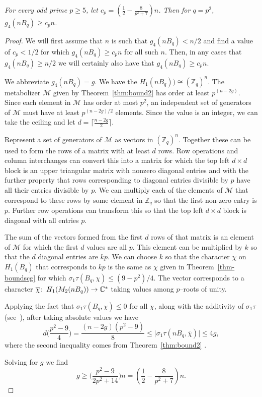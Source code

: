 \documentclass[10pt,oneside]{amsart}
\def\Z{{\mathbb Z}}
\def\C{{\mathbb C}}
\def\calm{\mathcal{M}}
\def\co{\colon\thinspace}
\theoremstyle{definition}
\begin{document}
 {\it  For every odd prime $p \ge 5$,  let  $c_p =  (\frac{1}{2}  - \frac{8}{p^2+7})n$. Then  for $q = p^2$,  $g_4(nB_q) \ge c_pn$.}
\begin{proof}
We will  first assume that $n$ is such that  $g_4(nB_q) < n/2$ and find a  value of $c_p < 1/2$ for which $g_4(nB_q) \ge c_p n$ for all such $n$.  Then, in any cases that $g_4(nB_q) \ge n/2$ we will certainly also have that $g_4(nB_q) \ge c_p n$.

We abbreviate $g_4(nB_q) = g$.
We have the $H_1(nB_q)) \cong (\Z_q)^n$.  The metabolizer $\calm$ given by Theorem~\ref{thm:bound2} has order at least $p^{(n - 2g)}$.  Since each element in $\calm$ has order at most $p^2$, an independent set of generators of $\calm$ must have at least $p^{(n - 2g)/2}$ elements.   Since the value is an integer, we can take the ceiling and  let $d = \lceil \frac{n - 2g}{2 } \rceil$.

Represent a set of generators of $\calm$ as vectors in $(\Z_q)^n$.  Together these can be used to form  the rows of a matrix with at least  $d$ rows.  Row operations and column interchanges can convert this into a matrix for which the top left $d \times d$ block is an upper triangular matrix with nonzero diagonal entries and with the  further property that  rows corresponding to diagonal entries divisible by $p$ have all their entries divisible by $p$.  We can multiply each of the  elements of $\calm$ that correspond to these rows by some element in $\Z_q$ so that the first non-zero entry is $p$.  Further row operations can transform this so that the  top left $d \times d$ block  is diagonal with   all entries $p$.

The sum of the   vectors formed from the  first $d$ rows of that matrix  is an element of $\calm$ for which the first $d$ values are all $p$.  This element  can be multiplied by $k$  so that  the $d$ diagonal   entries are $kp$.  We can choose $k$ so that the character  $\chi$  on $H_1(B_q)$ that corresponds to $kp$ is the same as  $\chi$ given in Theorem~\ref{thm-boundscg} for which $\sigma_1 \tau(B_q, \chi) \le (9 - p^2)/4$.   The vector corresponds to a character $\overline{\chi}\co H_1(M_2(nB_q) ) \to \C^*$ taking values among $p$--roots of unity.

Applying the fact that  $\sigma_1 \tau(B_q, \chi)  \le 0$ for all $\chi$, along with the additivity of $\sigma_1 \tau$ (see~\cite{MR711523}), after taking absolute values  we have
\[
d \big( \frac{p^2 - 9}{4}  \big)= \frac{ (n - 2g)(p^2 -  9)}{8 }\le \big|  \sigma_1\tau(nB_q, \overline{\chi}) \big|  \le 4 g,
\]
where the second inequality comes from Theorem~\ref{thm:bound2} .

Solving for $g$ we find
\[ g \ge\big( \frac{p^2 -9}{2p^2+ 14}\big) n = (\frac{1}{2}  - \frac{8}{p^2+7})n. \]
\end{proof}
\end{document}
